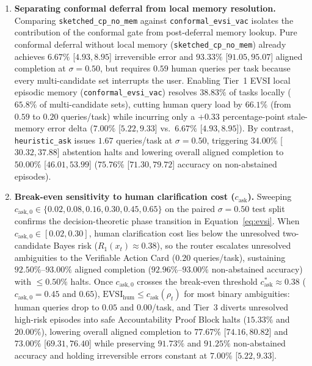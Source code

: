 \documentclass[11pt]{article}
\begin{document}
\begin{enumerate}
  \item \textbf{Separating conformal deferral from local memory resolution.} Comparing \texttt{sketched\_\linebreak[0]cp\_\linebreak[0]no\_\linebreak[0]mem} against \texttt{conformal\_\linebreak[0]evsi\_\linebreak[0]vac} isolates the contribution of the conformal gate from post-deferral memory lookup. Pure conformal deferral without local memory (\texttt{sketched\_\linebreak[0]cp\_\linebreak[0]no\_\linebreak[0]mem}) already achieves $6.67\%$ [$4.93, 8.95$] irreversible error and $93.33\%$ [$91.05, 95.07$] aligned completion at $\sigma=0.50$, but requires $0.59$ human queries per task because every multi-candidate set interrupts the user. Enabling Tier~1 EVSI local episodic memory (\texttt{conformal\_\linebreak[0]evsi\_\linebreak[0]vac}) resolves $38.83\%$ of tasks locally ($65.8\%$ of multi-candidate sets), cutting human query load by $66.1\%$ (from $0.59$ to $0.20$ queries/task) while incurring only a $+0.33$ percentage-point stale-memory error delta ($7.00\%$ [$5.22, 9.33$] vs.\ $6.67\%$ [$4.93, 8.95$]). By contrast, \texttt{heuristic\_\linebreak[0]ask} issues $1.67$ queries/task at $\sigma=0.50$, triggering $34.00\%$ [$30.32, 37.88$] abstention halts and lowering overall aligned completion to $50.00\%$ [$46.01, 53.99$] ($75.76\%$ [$71.30, 79.72$] accuracy on non-abstained episodes).
  \item \textbf{Break-even sensitivity to human clarification cost ($c_{\mathrm{ask}}$).} Sweeping $c_{\mathrm{ask},0} \allowbreak \in \{0.02,\allowbreak 0.08,\allowbreak 0.16,\allowbreak 0.30,\allowbreak 0.45,\allowbreak 0.65\}$ on the paired $\sigma=0.50$ test split confirms the decision-theoretic phase transition in Equation~\eqref{eq:evsi}. When $c_{\mathrm{ask},0} \allowbreak \in [0.02,\allowbreak 0.30]$, human clarification cost lies below the unresolved two-candidate Bayes risk ($R_1(x_t) \approx 0.38$), so the router escalates unresolved ambiguities to the Verifiable Action Card ($0.20$ queries/task), sustaining $92.50\%$--$93.00\%$ aligned completion ($92.96\%$--$93.00\%$ non-abstained accuracy) with $\le 0.50\%$ halts. Once $c_{\mathrm{ask},0}$ crosses the break-even threshold $c_{\mathrm{ask}}^* \approx 0.38$ ($c_{\mathrm{ask},0}=0.45$ and $0.65$), $\mathrm{EVSI}_{\mathrm{hum}} \le c_{\mathrm{ask}}(\rho_t)$ for most binary ambiguities: human queries drop to $0.05$ and $0.00$/task, and Tier~3 diverts unresolved high-risk episodes into safe Accountability Proof Block halts ($15.33\%$ and $20.00\%$), lowering overall aligned completion to $77.67\%$ [$74.16, 80.82$] and $73.00\%$ [$69.31, 76.40$] while preserving $91.73\%$ and $91.25\%$ non-abstained accuracy and holding irreversible errors constant at $7.00\%$ [$5.22, 9.33$].
\end{enumerate}
\end{document}
